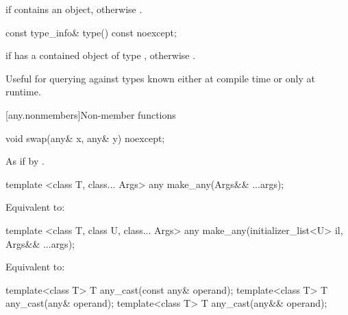 \begin{itemdescr}
\pnum
\returns
{} if  contains an object, otherwise .
\end{itemdescr}

%
\begin{itemdecl}
const type_info& type() const noexcept;
\end{itemdecl}

\begin{itemdescr}
\pnum
\returns
{} if  has a contained object of type ,
otherwise .

\pnum
\begin{note}
Useful for querying against types known either at compile time or only at runtime.
\end{note}
\end{itemdescr}

[any.nonmembers]{Non-member functions}

%
\begin{itemdecl}
void swap(any& x, any& y) noexcept;
\end{itemdecl}

\begin{itemdescr}
\pnum
\effects
As if by .
\end{itemdescr}

%
\begin{itemdecl}
template <class T, class... Args>
  any make_any(Args&& ...args);
\end{itemdecl}

\begin{itemdescr}
\pnum
\effects
Equivalent to: 
\end{itemdescr}

%
\begin{itemdecl}
template <class T, class U, class... Args>
  any make_any(initializer_list<U> il, Args&& ...args);
\end{itemdecl}

\begin{itemdescr}
\pnum
\effects
Equivalent to: 
\end{itemdescr}

%
\begin{itemdecl}
template<class T>
  T any_cast(const any& operand);
template<class T>
  T any_cast(any& operand);
template<class T>
  T any_cast(any&& operand);
\end{itemdecl}

